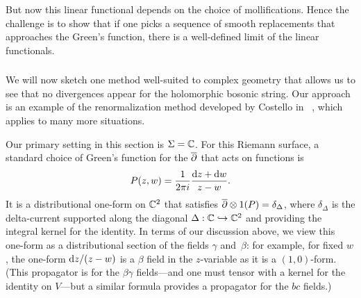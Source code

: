 But now this linear functional depends on the choice of mollifications.
Hence the challenge is to show that 
if one picks a sequence of smooth replacements that approaches the Green's function,
there is a well-defined limit of the linear functionals.

\subsubsection{}

We will now sketch one method well-suited to complex geometry
that allows us to see that no divergences appear for the holomorphic bosonic string.
Our approach is an example of the renormalization method developed by Costello in ~\cite{CosBook},
which applies to many more situations.

Our primary setting in this section is $\Sigma=\mathbb C$.
For this Riemann surface, 
a standard choice of Green's function for the $\overline{\partial}$ that acts on functions is
\[
P(z,w) = \frac{1}{2 \pi i} \frac{{\rm d} z + {\rm d} w}{z-w}.
\]
It is a distributional one-form on $\mathbb C^2$ that satisfies $\overline{\partial} \otimes 1(P) = \delta_\Delta$, 
where $\delta_\Delta$ is the delta-current supported along the diagonal $\Delta: \mathbb C \hookrightarrow \mathbb C^2$ and providing the integral kernel for the identity.
In terms of our discussion above,
we view this one-form as a distributional section of the fields $\gamma$ and~$\beta$: 
for example, for fixed $w$, the one-form ${\rm d} z/(z - w)$ is a $\beta$ field in the $z$-variable 
as it is a $(1,0)$-form.
(This propagator is for the $\beta\gamma$ fields---and one must tensor with a kernel for the identity on $V$---but a similar formula provides a propagator for the $bc$ fields.)

\subsubsection{}

